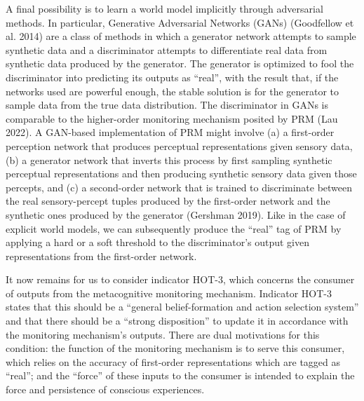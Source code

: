 \documentclass[12pt]{article}
\begin{document}
A final possibility is to learn a world model implicitly through adversarial methods. In particular, Generative Adversarial Networks (GANs) (Goodfellow et al. 2014) are a class of methods in which a generator network attempts to sample synthetic data and a discriminator attempts to differentiate real data from synthetic data produced by the generator. The generator is optimized to fool the discriminator into predicting its outputs as ``real'', with the result that, if the networks used are powerful enough, the stable solution is for the generator to sample data from the true data distribution. The discriminator in GANs is comparable to the higher-order monitoring mechanism posited by PRM (Lau 2022). A GAN-based implementation of PRM might involve (a) a first-order perception network that produces perceptual representations given sensory data, (b) a generator network that inverts this process by first sampling synthetic perceptual representations and then producing synthetic sensory data given those percepts, and (c) a second-order network that is trained to discriminate between the real sensory-percept tuples produced by the first-order network and the synthetic ones produced by the generator (Gershman 2019). Like in the case of explicit world models, we can subsequently produce the ``real'' tag of PRM by applying a hard or a soft threshold to the discriminator’s output given representations from the first-order network.

It now remains for us to consider indicator HOT-3, which concerns the consumer of outputs from the metacognitive monitoring mechanism. Indicator HOT-3 states that this should be a ``general belief-formation and action selection system'' and that there should be a ``strong disposition'' to update it in accordance with the monitoring mechanism’s outputs. There are dual motivations for this condition: the function of the monitoring mechanism is to serve this consumer, which relies on the accuracy of first-order representations which are tagged as ``real''; and the ``force'' of these inputs to the consumer is intended to explain the force and persistence of conscious experiences.
\end{document}
